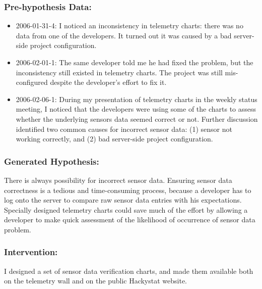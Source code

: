\subsubsection{Pre-hypothesis Data:}
\begin{itemize}
  \setlength{\itemsep}{0pt}
  \setlength{\parskip}{0pt}
  \item 2006-01-31-4: I noticed an inconsistency in telemetry charts: there was no data from one of the developers. It turned out it was caused by a bad server-side project configuration.
  \item 2006-02-01-1: The same developer told me he had fixed the problem, but the inconsistency still existed in telemetry charts. The project was still mis-configured despite the developer's effort to fix it.
  \item 2006-02-06-1: During my presentation of telemetry charts in the weekly status meeting, I noticed that the developers were using some of the charts to assess whether the underlying sensors data seemed correct or not. Further discussion identified two common causes for incorrect sensor data: (1) sensor not working correctly, and (2) bad server-side project configuration.
\end{itemize}

\subsubsection{Generated Hypothesis:}

There is always possibility for incorrect sensor data. Ensuring sensor data correctness is a tedious and time-consuming process, because a developer has to log onto the server to compare raw sensor data entries with his expectations. Specially designed telemetry charts could save much of the effort by allowing a developer to make quick assessment of the likelihood of occurrence of sensor data problem.

\subsubsection{Intervention:}

I designed a set of sensor data verification charts, and made them available both on the telemetry wall and on the public Hackystat website.

